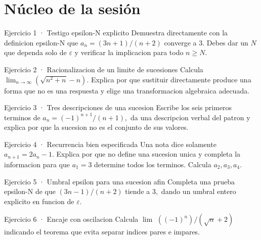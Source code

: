 \documentclass[10pt,a4paper,oneside,openany]{book}
\begin{document}
\section*{Núcleo de la sesión}
\begin{PSevenExerciseFixed}{Ejercicio 1 · Testigo epsilon-N explicito}
Demuestra directamente con la definicion epsilon-N que \(a_n=(3n+1)/(n+2)\) converge a \(3\). Debes dar un \(N\) que dependa solo de \(\varepsilon \) y verificar la implicacion para todo \(n\ge N\).
\end{PSevenExerciseFixed}
\begin{PSevenExerciseFixed}{Ejercicio 2 · Racionalizacion de un limite de sucesiones}
Calcula \(\lim_{n\to \infty }(\sqrt{n^{2}+n}-n)\). Explica por que sustituir directamente produce una forma que no es una respuesta y elige una transformacion algebraica adecuada.
\end{PSevenExerciseFixed}
\begin{PSevenExerciseFixed}{Ejercicio 3 · Tres descripciones de una sucesion}
Escribe los seis primeros terminos de \(a_n=(-1)^{n+1}/(n+1),\) da una descripcion verbal del patron y explica por que la sucesion no es el conjunto de sus valores.
\end{PSevenExerciseFixed}
\begin{PSevenExerciseFixed}{Ejercicio 4 · Recurrencia bien especificada}
Una nota dice solamente \(a_{n+1}=2a_n-1\). Explica por que no define una sucesion unica y completa la informacion para que \(a_1=3\) determine todos los terminos. Calcula \(a_2,a_3,a_4\).
\end{PSevenExerciseFixed}
\begin{PSevenExerciseFixed}{Ejercicio 5 · Umbral epsilon para una sucesion afin}
Completa una prueba epsilon-N de que \((3n-1)/(n+2)\) tiende a \(3,\) dando un umbral entero explicito en funcion de \(\varepsilon \).
\end{PSevenExerciseFixed}
\begin{PSevenExerciseFixed}{Ejercicio 6 · Encaje con oscilacion}
Calcula \(\lim\) \(((-1)^n)/(\sqrt{n}+2)\) indicando el teorema que evita separar indices pares e impares.
\end{PSevenExerciseFixed}
\end{document}
